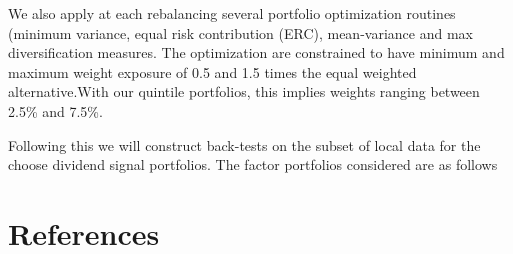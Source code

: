 \documentclass[11pt,preprint, authoryear]{elsarticle}
\numberwithin{equation}{section}
\numberwithin{figure}{section}
\numberwithin{table}{section}
\begin{document}
We also apply at each rebalancing several portfolio optimization
routines (minimum variance, equal risk contribution (ERC), mean-variance
and max diversification measures. The optimization are constrained to
have minimum and maximum weight exposure of 0.5 and 1.5 times the equal
weighted alternative.With our quintile portfolios, this implies weights
ranging between 2.5\% and 7.5\%.

Following this we will construct back-tests on the subset of local data
for the choose dividend signal portfolios. The factor portfolios
considered are as follows

\newpage

\hypertarget{references}{%
\section*{References}\label{references}}
\end{document}
